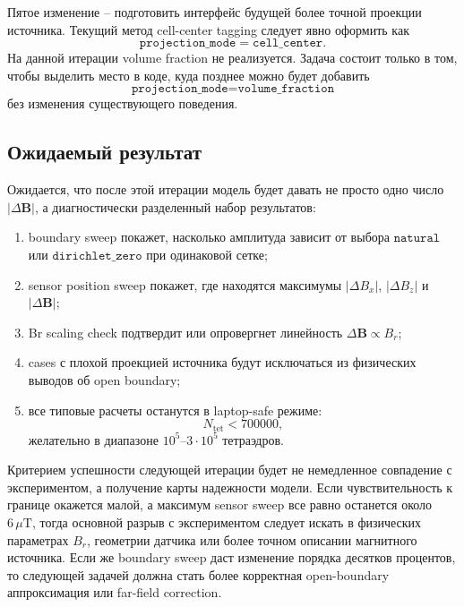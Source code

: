 \documentclass[12pt,a4paper]{article}
\begin{document}
Пятое изменение -- подготовить интерфейс будущей более точной проекции
источника. Текущий метод cell-center tagging следует явно оформить как
\[
    \texttt{projection\_mode}=\texttt{cell\_center}.
\]
На данной итерации volume fraction не реализуется. Задача состоит только в том,
чтобы выделить место в коде, куда позднее можно будет добавить
\[
    \texttt{projection\_mode}=\texttt{volume\_fraction}
\]
без изменения существующего поведения.

\subsection*{Ожидаемый результат}

Ожидается, что после этой итерации модель будет давать не просто одно число
\(|\Delta\mathbf B|\), а диагностически разделенный набор результатов:

\begin{enumerate}
    \item boundary sweep покажет, насколько амплитуда зависит от выбора
    \(\texttt{natural}\) или \(\texttt{dirichlet\_zero}\) при одинаковой сетке;

    \item sensor position sweep покажет, где находятся максимумы
    \(|\Delta B_x|\), \(|\Delta B_z|\) и \(|\Delta\mathbf B|\);

    \item Br scaling check подтвердит или опровергнет линейность
    \(\Delta\mathbf B\propto B_r\);

    \item cases с плохой проекцией источника будут исключаться из физических
    выводов об open boundary;

    \item все типовые расчеты останутся в laptop-safe режиме:
    \[
        N_{\mathrm{tet}}<700000,
    \]
    желательно в диапазоне \(10^5\)--\(3\cdot 10^5\) тетраэдров.
\end{enumerate}

Критерием успешности следующей итерации будет не немедленное совпадение с
экспериментом, а получение карты надежности модели. Если чувствительность к
границе окажется малой, а максимум sensor sweep все равно останется около
\(6\,\mu\mathrm{T}\), тогда основной разрыв с экспериментом следует искать в
физических параметрах \(B_r\), геометрии датчика или более точном описании
магнитного источника. Если же boundary sweep даст изменение порядка десятков
процентов, то следующей задачей должна стать более корректная open-boundary
аппроксимация или far-field correction.
\end{document}
